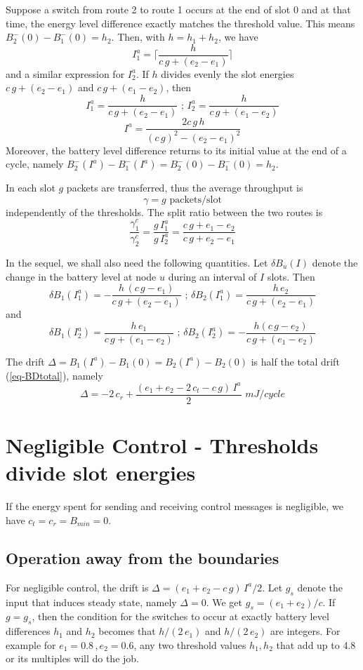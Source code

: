 \documentclass[12 pt]{article}
\newcommand{\debug}[1]{\mbox{\tt #1}}
\renewcommand{\debug}[1]{}              \newcommand{\cmd}[1]{}
\newcommand{\2}{\>\>}
\newcommand{\3}{\>\>\>}
\newcommand{\4}{\>\>\>\>}
\newcommand{\5}{\>\>\>\>\>}
\newcommand{\6}{\>\>\>\>\>\>}
\newcommand{\7}{\6\>}
\newcommand{\8}{\6\2}
\newcommand{\EB}{\begin{equation}\cmd{EB}}
\newcommand{\EE}[1]{ \debug{\fbox{\sname #1}}\label{\sname #1} \end{equation}\cmd{EE} }
\newcommand{\sname}{}
\newcommand{\dref}[1]{\ref{#1}\debug{[#1]}\cmd{dref}}
\newcommand{\dlabelx}[1]{\debug{\fbox{\tiny #1}}\label{#1}}
\newcommand{\msec}[2]{\renewcommand{\sname}{}\section[#1
	\debug{\fbox {#2}}]{#1 \cmd{msec} \dlabelx{#2}}\markboth{\today}{Sec. \thesection}}
\newcommand{\msubsection}[2]{\subsection[#1 \debug{\fbox {#2}}]
	{#1 \cmd{msubsection} \dlabelx{#2}}\markboth{\today}{Sec. \thesection}}
\begin{document}
Suppose a switch from route 2 to route 1 occurs at the end of slot $0$ and at that time, the energy level difference exactly matches the threshold value.  This means $B^{-}_2(0) - B^{-}_1(0) = h_2$.  Then, with $h = h_1 + h_2$, we have
\EB
I_1^a=\lceil\frac{h}{ c\,g+(e_2-e_1)}\rceil
\EE{eq-I1aaa}
and a similar expression for $I_2^a$.
If $h$ divides evenly the slot energies $c\,g+(e_2-e_1)$ and $c\,g+(e_1-e_2)$, then
\EB
I_1^a=\frac{h}{ c\,g+(e_2-e_1)}\text{     ;     }
I_2^a=\frac{h}{ c\,g+(e_1-e_2)}
\EE{eq-Ia}
\EB
I^a = \frac{2c\,g\,h}{(c\,g)^2 - (e_2 - e_1)^2}
\EE{eq-away}
Moreover, the battery level difference returns to its initial value at the end of a cycle, namely
$B^{-}_2(I^a) - B^{-}_1(I^a) = B^{-}_2(0) - B^{-}_1(0) = h_2$.

In each slot $g$ packets are transferred, thus the average throughput is
\EB
\gamma = g \text{      packets/slot}
\EE{throughput}
independently of the thresholds.
The split ratio between the two routes is
\EB
\frac{\gamma_1^c}{\gamma_2^c} = \frac{g\,I_1^a}{g\,I_2^a} = \frac{c\,g+e_1-e_2}{c\,g+e_2-e_1}
\EE{eq-split0}

In the sequel, we shall also need the following quantities.
Let $\delta B_u (I)$ denote the change in the battery level at node $u$ during an interval of $I$ slots.  Then
\EB
\delta B_1(I_1^a) = -\frac{h\,(c\,g -e_1)}{ c\,g+(e_2-e_1)} \text{        ;         }
\delta B_2(I_1^a) = \frac{h\, e_2}{ c\,g+(e_2-e_1)}
\EE{eq-Delta}
and
\EB
\delta B_1(I_2^a) = \frac{h\, e_1}{ c\,g+(e_1-e_2)} \text{        ;         }
\delta B_2(I_2^a) = -\frac{h(c\, g - e_2)}{ c\,g+(e_1-e_2)}
\EE{eq-Delta1}

The drift $\Delta  = B_1(I^a) - B_1(0) = B_2(I^a) - B_2(0)$ is half the total drift (\dref{eq-BDtotal}), namely
\EB
\Delta = -2\,c_r   + \frac{(e_1 + e_2 -2\,c_t-c\,g)\,I^a}{2}\,\,mJ/cycle
\EE{eq-B}

\msec{Negligible Control - Thresholds divide slot energies}{negli}

If the energy spent for sending and receiving control messages is negligible, we have
$c_t = c_r = B_{min} = 0$.

\msubsection{Operation away from the boundaries}{awayq}

For negligible control, the drift is $\Delta = (e_1 + e_2 - c\,g)\,I^a/2$.
Let $g_s$ denote the input that induces steady state, namely $\Delta = 0 $.  We get $g_s = (e_1 + e_2)/c$.  If $g = g_s$, then the condition for the switches to occur at exactly battery level differences $h_1$ and $h_2$ becomes that $h/(2\,e_1)$ and $h/(2\,e_2)$ are integers.  For example for $e_1 = 0.8\, , e_2 = 0.6$, any two threshold values $h_1, h_2$ that add up to 4.8 or its multiples will do the job.
\end{document}
